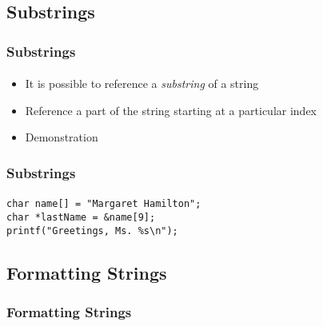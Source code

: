 \documentclass[]{beamer}
\begin{document}
\subsection{Substrings}


\begin{frame}[fragile]
  \frametitle{Substrings}
  \framesubtitle{}
  
\begin{itemize}[<+->]
  \item It is possible to reference a \emph{substring} of a string
  \item Reference a part of the string starting at a particular index
  \item Demonstration
\end{itemize}
    
\end{frame}

\begin{frame}[fragile]
  \frametitle{Substrings}
  \framesubtitle{}
  
\begin{verbatim}
char name[] = "Margaret Hamilton";
char *lastName = &name[9];
printf("Greetings, Ms. %s\n");
\end{verbatim}
    
\end{frame}

\subsection{Formatting Strings}


\begin{frame}[fragile]
  \frametitle{Formatting Strings}
  \framesubtitle{}

    
\end{frame}
\end{document}
